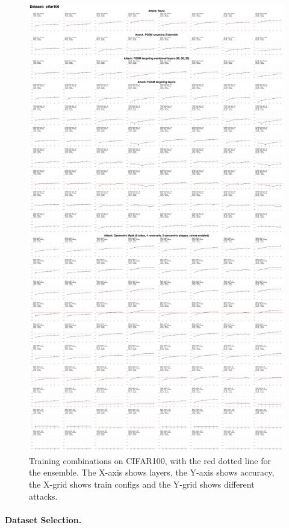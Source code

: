 \documentclass[a4paper, oneside]{discothesis}
\begin{document}
\begin{figure}
	\centering
	\includegraphics[width=\textwidth,height=\textheight,keepaspectratio]{figures/self_ensemble_8train_cifar100.pdf}
	\caption{Training combinations on CIFAR100, with the red dotted line for the ensemble. The X-axis shows layers, the Y-axis shows accuracy, the X-grid shows train configs and the Y-grid shows different attacks.}
	\label{fig:8train-cifar100}
\end{figure}

\paragraph{Dataset Selection.}
\end{document}
